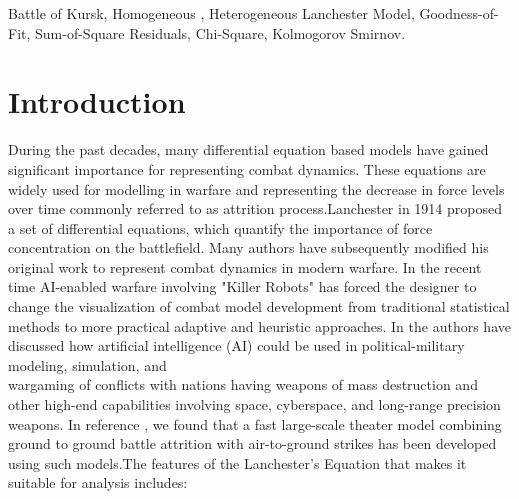 \documentclass[]{article}
\begin{document}
\begin{keywords}
Battle of Kursk, Homogeneous , Heterogeneous Lanchester Model, Goodness-of-Fit,  Sum-of-Square Residuals, Chi-Square, Kolmogorov Smirnov.
\end{keywords}
\newpage


\section{Introduction}
During the past decades, many differential equation based models \autocite{HelmboldRehm:1991,Lanchester:1916,Osipov:1915,Weiss:1975,Schramm:2012} have gained significant importance for representing combat dynamics. These equations are widely used for modelling in warfare and representing the decrease in force levels over time commonly referred to as attrition process.Lanchester in 1914 proposed a set of differential equations, which quantify the importance of force concentration on the battlefield. Many authors have subsequently modified his original work to represent combat dynamics in modern warfare. In the recent time AI-enabled warfare involving "Killer Robots" \autocite{lethalRobots} has forced the designer to change the visualization of combat model development from traditional statistical methods to more practical adaptive and heuristic approaches. In \autocite{Davis2022ArtificialIF} the authors have discussed how artificial intelligence (AI) could be used in political-military modeling, simulation, and \\wargaming of conflicts with nations having weapons of mass destruction and other high-end capabilities involving space, cyberspace, and long-range precision weapons. In reference \autocite{FATHM:2007}, we found that a fast large-scale theater model combining ground to ground battle attrition with air-to-ground strikes has been developed using such models.The features of the Lanchester's Equation that makes it suitable for analysis includes:
\end{document}
